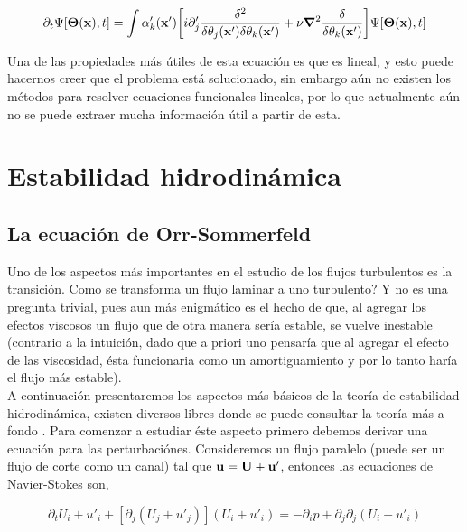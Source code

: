 \documentclass[executivepaper,12pt]{article}
\numberwithin{equation}{section}
\begin{document}
\begin{equation*}
	\partial_t \Psi [\bm{\Theta}(\vb{x}),t] = \int \alpha'_k(\vb{x}')\bigg[i\partial'_j \frac{\delta^2}{\delta\theta_j(\vb{x}') \delta\theta_k(\vb{x}')}  +\nu\grad{}^2 \frac{\delta}{\delta\theta_k(\vb{x}')} \bigg] \Psi [\bm{\Theta}(\vb{x}),t]
\end{equation*}

Una de las propiedades más útiles de esta ecuación es que es lineal, y esto puede hacernos creer que el problema está solucionado, sin embargo aún no existen los métodos para resolver ecuaciones funcionales lineales, por lo que actualmente aún no se puede extraer mucha información útil a partir de esta.




\pagebreak

\section{Estabilidad hidrodinámica}

\subsection{La ecuación de Orr-Sommerfeld}
Uno de los aspectos más importantes en el estudio de los flujos turbulentos es la transición. Como se transforma un flujo laminar a uno turbulento? Y no es una pregunta trivial, pues aun más enigmático es el hecho de que, al agregar los efectos viscosos un flujo que de otra manera sería estable, se vuelve inestable (contrario a la intuición, dado que a priori uno pensaría que al agregar el efecto de las viscosidad, ésta funcionaria como un amortiguamiento y por lo tanto haría el flujo más estable).\\
A continuación presentaremos los aspectos más básicos de la teoría de estabilidad hidrodinámica, existen diversos libres donde se puede consultar la teoría más a fondo \parencite{criminale2018,schlichting2016,chandrasekhar2013,yaglom2012}. Para comenzar a estudiar éste aspecto primero debemos derivar una ecuación para las perturbaciónes. Consideremos un flujo paralelo (puede ser un flujo de corte como un canal) tal que $\vb{u}=\vb{U}+\vb{u}'$, entonces las ecuaciones de Navier-Stokes son,

\begin{equation}
	\partial_t U_i+u'_i+\left[\partial_{j}(U_j+u'_j)\right](U_i+u'_i)=-\partial_i p + \partial_j\partial_{j} (U_i+u'_i)
\end{equation}  
\end{document}
